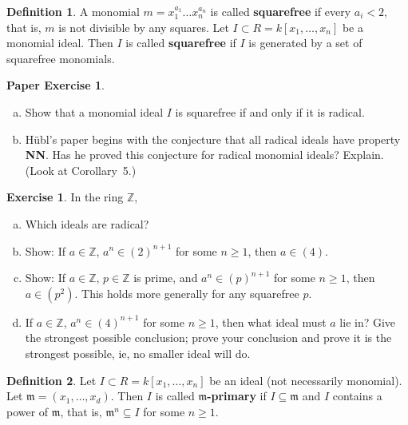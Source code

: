 \documentclass{amsart}
\theoremstyle{plain}
\theoremstyle{definition}
\newtheorem{definition}{Definition}
\newtheorem{exercise}[theorem]{Exercise}
\newtheorem{paperexercise}[theorem]{Paper Exercise}
\theoremstyle{definition}
\newcommand{\defining}[1]{\textbf{#1}}
\newcommand{\m}{\mathfrak{m}}
\newcommand{\Z}{\mathbb{Z}}
\begin{document}
\begin{definition}
A monomial $m = x_1^{a_1} \dots x_n^{a_n}$ is called \defining{squarefree}
if every $a_i < 2$, that is, $m$ is not divisible by any squares.
Let $I \subset R = k[x_1, \dots, x_n]$ be a monomial ideal.
Then $I$ is called \defining{squarefree} if $I$ is generated by a set of squarefree monomials.
\end{definition}

\begin{paperexercise}
\begin{enumerate}[a.]
\item Show that a monomial ideal $I$ is squarefree if and only if it is radical.
\item H\"ubl's paper begins with the conjecture that all radical ideals have property \textbf{NN}.
Has he proved this conjecture for radical monomial ideals? Explain. (Look at Corollary~5.)
\end{enumerate}
\end{paperexercise}

\begin{exercise} In the ring $\Z$,
\begin{enumerate}[a.]
\item Which ideals are radical?
\item Show: If $a \in \Z$, $a^n \in (2)^{n+1}$ for some $n \geq 1$, then $a \in (4)$.
\item Show: If $a \in \Z$, $p \in \Z$ is prime, and $a^n \in (p)^{n+1}$ for some $n \geq 1$, then $a \in (p^2)$.
This holds more generally for any squarefree $p$.
\item If $a \in \Z$, $a^n \in (4)^{n+1}$ for some $n \geq 1$, then what ideal must $a$ lie in?
Give the strongest possible conclusion; prove your conclusion and prove it is the strongest possible, ie, no smaller ideal will do.
\end{enumerate}
\end{exercise}

\begin{definition}
Let $I \subset R = k[x_1,\dots,x_n]$ be an ideal (not necessarily monomial).
Let $\m = (x_1,\dots,x_d)$.
Then $I$ is called \defining{$\m$-primary} if $I \subseteq \m$ and $I$ contains a power of $\m$,
that is, $\m^n \subseteq I$ for some $n \geq 1$.
\end{definition}
\end{document}
